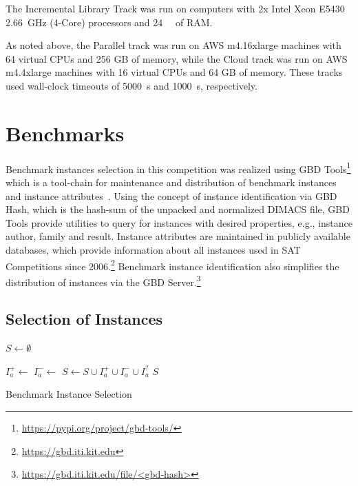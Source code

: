 \documentclass{elsarticle}
\begin{document}
The Incremental Library Track was run on computers with 2x Intel Xeon E5430 \SI{2.66}{\giga\hertz}
(4-Core) processors and \SI{24}{\giga\byte} of RAM.

As noted above, the Parallel track was run on AWS m4.16xlarge machines with 64 virtual CPUs and 256 GB
of memory, while the Cloud track was run on AWS m4.4xlarge machines with 16 virtual CPUs and 64 GB of
memory. These tracks used wall-clock timeouts of \SI{5000}{\second} and \SI{1000}{\second}, respectively.

\section{Benchmarks}
\label{sec:instances}

Benchmark instances selection in this competition was realized using GBD Tools\footnote{\url{https://pypi.org/project/gbd-tools/}} which is a tool-chain for maintenance and distribution of benchmark instances and instance attributes~\cite{Iser:2018:GBD}.
Using the concept of instance identification via GBD Hash, which is the hash-sum of the unpacked and normalized DIMACS file, GBD Tools provide utilities to query for instances with desired properties, e.g., instance author, family and result.
Instance attributes are maintained in publicly available databases, which provide information about all instances used in SAT Competitions since 2006.\footnote{\url{https://gbd.iti.kit.edu}} 
Benchmark instance identification also simplifies the distribution of instances via the GBD Server.\footnote{\url{https://gbd.iti.kit.edu/file/<gbd-hash>}}


\subsection{Selection of Instances}
\label{sec:byob}

\begin{algorithm}[t]
\DontPrintSemicolon
\small
{}
\BlankLine
$S \leftarrow \emptyset$\;

 {
	$I_a^+ \leftarrow$ \;	
	$I_a^- \leftarrow$ \;	
	$S \leftarrow S \cup I_a^+ \cup I_a^- \cup I_a^?$\;	
}
\Return $S$\;

\caption{Benchmark Instance Selection}
\label{algo:select}
\end{algorithm}
\end{document}
